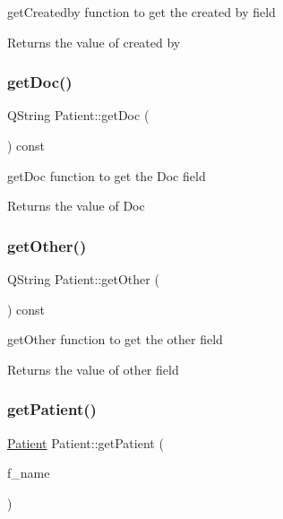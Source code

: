 get\+Createdby function to get the created by field 

\begin{DoxyReturn}{Returns}
the value of created by 
\end{DoxyReturn}
\mbox{\label{class_patient_a8b74db0ad3cc5ea785a31cedc7eb5a42}} 
\subsubsection{\texorpdfstring{getDoc()}{getDoc()}}
{\footnotesize\ttfamily Q\+String Patient\+::get\+Doc (\begin{DoxyParamCaption}{ }\end{DoxyParamCaption}) const}



get\+Doc function to get the Doc field 

\begin{DoxyReturn}{Returns}
the value of Doc 
\end{DoxyReturn}
\mbox{\label{class_patient_a819426aede04a6a89b17ea705757cd29}} 
\subsubsection{\texorpdfstring{getOther()}{getOther()}}
{\footnotesize\ttfamily Q\+String Patient\+::get\+Other (\begin{DoxyParamCaption}{ }\end{DoxyParamCaption}) const}



get\+Other function to get the other field 

\begin{DoxyReturn}{Returns}
the value of other field 
\end{DoxyReturn}
\mbox{\label{class_patient_aa6017acec4a2b7d3257912f22cc12753}} 
\subsubsection{\texorpdfstring{getPatient()}{getPatient()}}
{\footnotesize\ttfamily \mbox{\hyperlink{class_patient}{Patient}} Patient\+::get\+Patient (\begin{DoxyParamCaption}\item[{Q\+String}]{f\+\_\+name }\end{DoxyParamCaption})}



